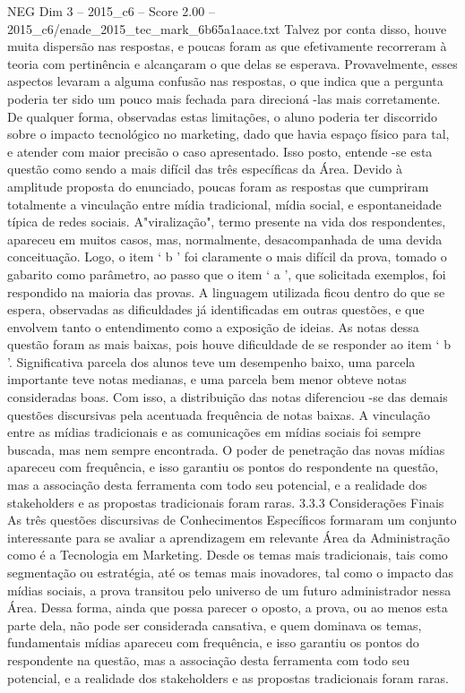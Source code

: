 \begin{textsample}{NEG Dim 3 – 2015\_c6 – Score 2.00 – 2015\_c6/enade\_2015\_tec\_mark\_6b65a1aace.txt}
Talvez por conta disso, houve muita dispersão nas respostas, e poucas foram as que efetivamente recorreram à teoria com pertinência e alcançaram o que delas se esperava.
Provavelmente, esses aspectos levaram a alguma confusão nas respostas, o que indica que a pergunta poderia ter sido um pouco mais fechada para direcioná -las mais corretamente.
De qualquer forma, observadas estas limitações, o aluno poderia ter discorrido sobre o impacto tecnológico no marketing, dado que havia espaço físico para tal, e atender com maior precisão o caso apresentado.
Isso posto, entende -se esta questão como sendo a mais difícil das três específicas da Área.
Devido à amplitude proposta do enunciado, poucas foram as respostas que cumpriram totalmente a vinculação entre mídia tradicional, mídia social, e espontaneidade típica de redes sociais.
A"viralização", termo presente na vida dos respondentes, apareceu em muitos casos, mas, normalmente, desacompanhada de uma devida conceituação.
Logo, o item ‘ b ’ foi claramente o mais difícil da prova, tomado o gabarito como parâmetro, ao passo que o item ‘ a ’, que solicitada exemplos, foi respondido na maioria das provas.
A linguagem utilizada ficou dentro do que se espera, observadas as dificuldades já identificadas em outras questões, e que envolvem tanto o entendimento como a exposição de ideias.
As notas dessa questão foram as mais baixas, pois houve dificuldade de se responder ao item ‘ b ’.
Significativa parcela dos alunos teve um desempenho baixo, uma parcela importante teve notas medianas, e uma parcela bem menor obteve notas consideradas boas.
Com isso, a distribuição das notas diferenciou -se das demais questões discursivas pela acentuada frequência de notas baixas.
A vinculação entre as mídias tradicionais e as comunicações em mídias sociais foi sempre buscada, mas nem sempre encontrada.
O poder de penetração das novas mídias apareceu com frequência, e isso garantiu os pontos do respondente na questão, mas a associação desta ferramenta com todo seu potencial, e a realidade dos stakeholders e as propostas tradicionais foram raras. 3.3.3 Considerações Finais As três questões discursivas de Conhecimentos Específicos formaram um conjunto interessante para se avaliar a aprendizagem em relevante Área da Administração como é a Tecnologia em Marketing.
Desde os temas mais tradicionais, tais como segmentação ou estratégia, até os temas mais inovadores, tal como o impacto das mídias sociais, a prova transitou pelo universo de um futuro administrador nessa Área.
Dessa forma, ainda que possa parecer o oposto, a prova, ou ao menos esta parte dela, não pode ser considerada cansativa, e quem dominava os temas, fundamentais mídias apareceu com frequência, e isso garantiu os pontos do respondente na questão, mas a associação desta ferramenta com todo seu potencial, e a realidade dos stakeholders e as propostas tradicionais foram raras.

\end{textsample}
